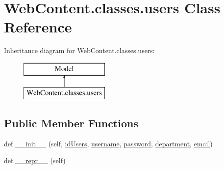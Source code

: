 \hypertarget{class_web_content_1_1classes_1_1users}{}\section{Web\+Content.\+classes.\+users Class Reference}
\label{class_web_content_1_1classes_1_1users}
Inheritance diagram for Web\+Content.\+classes.\+users\+:\begin{figure}[H]
\begin{center}
\leavevmode
\includegraphics[height=2.000000cm]{class_web_content_1_1classes_1_1users}
\end{center}
\end{figure}
\subsection*{Public Member Functions}
\begin{DoxyCompactItemize}
\item 
def \hyperlink{class_web_content_1_1classes_1_1users_ad5964e00cfc6f7b41c3309c7679166dc}{\+\_\+\+\_\+init\+\_\+\+\_\+} (self, \hyperlink{class_web_content_1_1classes_1_1users_ac626a21b539eab7dfd3170533ff98fad}{id\+Users}, \hyperlink{class_web_content_1_1classes_1_1users_afb64ef703cb89d0c372007783ca92878}{username}, \hyperlink{class_web_content_1_1classes_1_1users_a872abe3f6d9eea4f7297bff086678579}{password}, \hyperlink{class_web_content_1_1classes_1_1users_afd71cf2bea8a6b8fd393fd651f2448cc}{department}, \hyperlink{class_web_content_1_1classes_1_1users_aa30c070613e830426f817c9a999b351e}{email})
\item 
def \hyperlink{class_web_content_1_1classes_1_1users_a84e8d242e4e64e56b9a038f2927ae71b}{\+\_\+\+\_\+repr\+\_\+\+\_\+} (self)
\end{DoxyCompactItemize}
